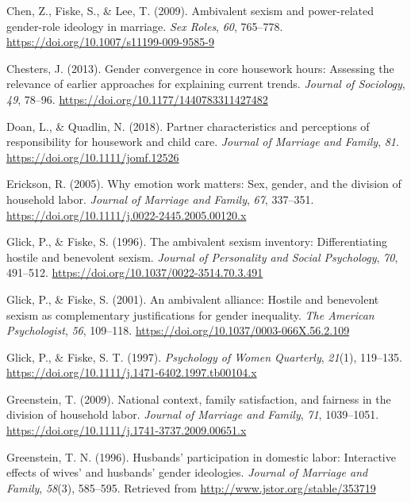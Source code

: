 \documentclass[
  man]{apa6}
\newlength{\cslhangindent}
\newlength{\cslentryspacingunit} %
\newenvironment{CSLReferences}[2] %
 {%
  \setlength{\parindent}{0pt}
  \ifodd #1
  \let\oldpar\par
  \def\par{\hangindent=\cslhangindent\oldpar}
  \fi
  \setlength{\parskip}{#2\cslentryspacingunit}
 }%
 {}
\begin{document}
\begin{CSLReferences}{1}{0}
\leavevmode{}%
Chen, Z., Fiske, S., \& Lee, T. (2009). Ambivalent sexism and power-related gender-role ideology in marriage. \emph{Sex Roles}, \emph{60}, 765--778. \url{https://doi.org/10.1007/s11199-009-9585-9}

\leavevmode{}%
Chesters, J. (2013). Gender convergence in core housework hours: Assessing the relevance of earlier approaches for explaining current trends. \emph{Journal of Sociology}, \emph{49}, 78--96. \url{https://doi.org/10.1177/1440783311427482}

\leavevmode{}%
Doan, L., \& Quadlin, N. (2018). Partner characteristics and perceptions of responsibility for housework and child care. \emph{Journal of Marriage and Family}, \emph{81}. \url{https://doi.org/10.1111/jomf.12526}

\leavevmode{}%
Erickson, R. (2005). Why emotion work matters: Sex, gender, and the division of household labor. \emph{Journal of Marriage and Family}, \emph{67}, 337--351. \url{https://doi.org/10.1111/j.0022-2445.2005.00120.x}

\leavevmode{}%
Glick, P., \& Fiske, S. (1996). The ambivalent sexism inventory: Differentiating hostile and benevolent sexism. \emph{Journal of Personality and Social Psychology}, \emph{70}, 491--512. \url{https://doi.org/10.1037/0022-3514.70.3.491}

\leavevmode{}%
Glick, P., \& Fiske, S. (2001). An ambivalent alliance: Hostile and benevolent sexism as complementary justifications for gender inequality. \emph{The American Psychologist}, \emph{56}, 109--118. \url{https://doi.org/10.1037/0003-066X.56.2.109}

\leavevmode{}%
Glick, P., \& Fiske, S. T. (1997). \emph{Psychology of Women Quarterly}, \emph{21}(1), 119--135. \url{https://doi.org/10.1111/j.1471-6402.1997.tb00104.x}

\leavevmode{}%
Greenstein, T. (2009). National context, family satisfaction, and fairness in the division of household labor. \emph{Journal of Marriage and Family}, \emph{71}, 1039--1051. \url{https://doi.org/10.1111/j.1741-3737.2009.00651.x}

\leavevmode{}%
Greenstein, T. N. (1996). Husbands' participation in domestic labor: Interactive effects of wives' and husbands' gender ideologies. \emph{Journal of Marriage and Family}, \emph{58}(3), 585--595. Retrieved from \url{http://www.jstor.org/stable/353719}


\end{CSLReferences}
\end{document}
